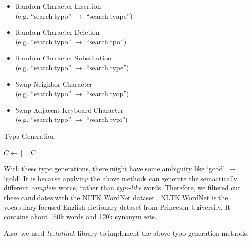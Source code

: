 \documentclass[11pt,a4paper]{article}
\begin{document}
\begin{itemize}
    \item Random Character Insertion     \\ (e.g. ``search typo'' $\rightarrow$ ``search tyapo'')
    \item Random Character Deletion      \\ (e.g. ``search typo'' $\rightarrow$ ``search tpo'')
    \item Random Character Substitution  \\ (e.g. ``search typo'' $\rightarrow$ ``search type'')
    \item Swap Neighbor Character        \\ (e.g. ``search typo'' $\rightarrow$ ``search tyop'')
    \item Swap Adjacent Keyboard Character \\ (e.g. ``search typo'' $\rightarrow$ ``search typi'')
\end{itemize}

\begin{algorithm}[hbt!]
    \centering
    \caption{Typo Generation}
    \label{alg:Typo}
    \begin{algorithmic}[1]
    
        \State \Return []
    \EndIf
    \State $C\gets [ ]$ 
        \EndIf
    \EndWhile
    \State \Return C
    \EndProcedure
    
    \end{algorithmic}
    
\end{algorithm}

With these typo generations, there might have some ambiguity like `good' $\rightarrow$ `gold'.
It is because applying the above methods can generate the semantically different \textit{complete} words, rather than \textit{typo-like} words. Therefore, we filtered out these candidates with the NLTK WordNet dataset \cite{Princeton_2010}.
NLTK WordNet is the vocabulary-focused English dictionary dataset from Princeton University.
It contains about 160k words and 120k synonym sets.

Also, we used \textit{textattack} library \cite{morris2020textattack} to implement the above typo generation methods.
\end{document}
